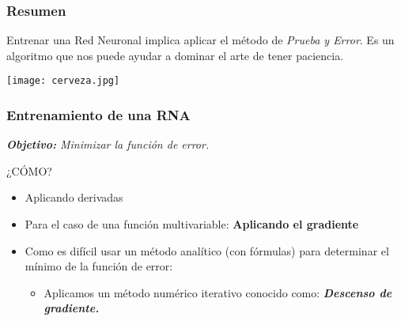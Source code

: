 \begin{frame}
	\frametitle{Resumen}
	\begin{center}
		{\large Entrenar una Red Neuronal implica aplicar el método de \textit{Prueba y Error}. Es un algoritmo que nos puede ayudar a dominar el arte de tener paciencia.}
		
		\vspace{5mm}
		
		\texttt{[image: cerveza.jpg]}
		
	\end{center}
	
\end{frame}


\begin{frame}
	\frametitle{Entrenamiento de una RNA}
	
	\textit{\textbf{Objetivo:} Minimizar la función de error.}
	\vspace{3mm}
	
	¿CÓMO?
	\vspace{3mm}
	
	\begin{itemize}
		\item Aplicando derivadas
		\item Para el caso de una función multivariable: \textbf{Aplicando el gradiente}
		\item Como es difícil usar un método analítico (con fórmulas) para determinar el mínimo de la función de error:
		\begin{itemize}
			\item Aplicamos un método numérico iterativo conocido como: \textit{\textbf{Descenso de gradiente.}}
		\end{itemize}
	\end{itemize}
        
 
\end{frame}


